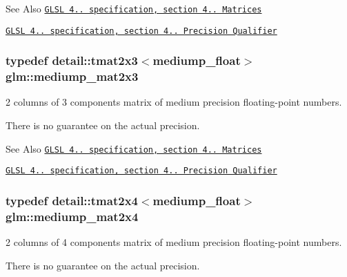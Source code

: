 \begin{DoxySeeAlso}{See Also}
\href{http://www.opengl.org/registry/doc/GLSLangSpec.4.20.8.pdf}{\tt G\-L\-S\-L 4.. specification, section 4.. Matrices} 

\href{http://www.opengl.org/registry/doc/GLSLangSpec.4.20.8.pdf}{\tt G\-L\-S\-L 4.. specification, section 4.. Precision Qualifier} 
\end{DoxySeeAlso}
\hypertarget{group__core__precision_gac44c7deb23abed76330948e10d919bcc}{
\subsubsection[{mediump\-\_\-mat2x3}]{\setlength{\rightskip}{0pt plus 5cm}typedef detail\-::tmat2x3$<$mediump\-\_\-float$>$ {\bf glm\-::mediump\-\_\-mat2x3}}}\label{group__core__precision_gac44c7deb23abed76330948e10d919bcc}


2 columns of 3 components matrix of medium precision floating-\/point numbers. 

There is no guarantee on the actual precision.

\begin{DoxySeeAlso}{See Also}
\href{http://www.opengl.org/registry/doc/GLSLangSpec.4.20.8.pdf}{\tt G\-L\-S\-L 4.. specification, section 4.. Matrices} 

\href{http://www.opengl.org/registry/doc/GLSLangSpec.4.20.8.pdf}{\tt G\-L\-S\-L 4.. specification, section 4.. Precision Qualifier} 
\end{DoxySeeAlso}
\hypertarget{group__core__precision_ga2e80caa3f70e504bd574664b1029e627}{
\subsubsection[{mediump\-\_\-mat2x4}]{\setlength{\rightskip}{0pt plus 5cm}typedef detail\-::tmat2x4$<$mediump\-\_\-float$>$ {\bf glm\-::mediump\-\_\-mat2x4}}}\label{group__core__precision_ga2e80caa3f70e504bd574664b1029e627}


2 columns of 4 components matrix of medium precision floating-\/point numbers. 

There is no guarantee on the actual precision.

